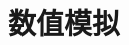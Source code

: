 \documentclass[notitlepage,cs4size,punct,oneside]{ctexrep}
\numberwithin{equation}{section}
\theoremstyle{mystyle}
\begin{document}
\section{数值模拟}


\end{document}
